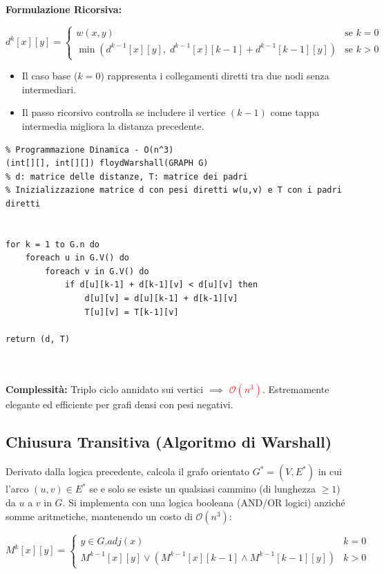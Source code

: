 \documentclass[12pt, a4paper]{article}
\begin{document}
\textbf{Formulazione Ricorsiva:}

$$d^k[x][y] = \begin{cases} w(x,y) & \text{se } k = 0 \\ \min(d^{k-1}[x][y], \; d^{k-1}[x][k-1] + d^{k-1}[k-1][y]) & \text{se } k > 0 \end{cases}$$


\begin{itemize}
\item Il caso base ($k=0$) rappresenta i collegamenti diretti tra due nodi senza intermediari.
\item Il passo ricorsivo controlla se includere il vertice $(k-1)$ come tappa intermedia migliora la distanza precedente.
\end{itemize}

\begin{verbatim}
% Programmazione Dinamica - O(n^3)
(int[][], int[][]) floydWarshall(GRAPH G)
% d: matrice delle distanze, T: matrice dei padri
% Inizializzazione matrice d con pesi diretti w(u,v) e T con i padri diretti


for k = 1 to G.n do
    foreach u in G.V() do
        foreach v in G.V() do
            if d[u][k-1] + d[k-1][v] < d[u][v] then
                d[u][v] = d[u][k-1] + d[k-1][v]
                T[u][v] = T[k-1][v]
                
return (d, T)



\end{verbatim}
\textbf{Complessità:} Triplo ciclo annidato sui vertici $\implies$ \textcolor{red}{$\mathcal{O}(n^3)$}. Estremamente elegante ed efficiente per grafi densi con pesi negativi.

\subsection{Chiusura Transitiva (Algoritmo di Warshall)}
Derivato dalla logica precedente, calcola il grafo orientato $G^* = (V, E^*)$ in cui l'arco $(u, v) \in E^*$ se e solo se esiste un qualsiasi cammino (di lunghezza $\ge 1$) da $u$ a $v$ in $G$.
Si implementa con una logica booleana (AND/OR logici) anziché somme aritmetiche, mantenendo un costo di $\mathcal{O}(n^3)$:


$$M^k[x][y] = \begin{cases} y \in G.adj(x) & k = 0 \\ M^{k-1}[x][y] \lor (M^{k-1}[x][k-1] \land M^{k-1}[k-1][y]) & k > 0 \end{cases}$$
\end{document}
